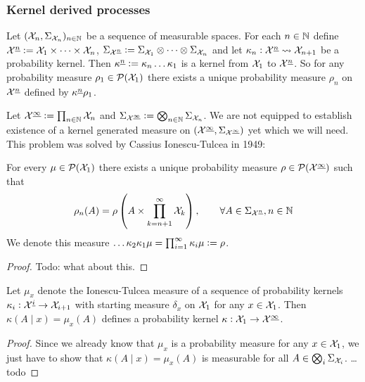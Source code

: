 \subsubsection{Kernel derived processes}

Let $(\mathcal{X}_n, \Sigma_{\mathcal{X}_n})_{n \in \mathbb{N}}$ be a sequence
of measurable spaces. For each $n \in \mathbb{N}$ define
$\mathcal{X}^{\underline{n}} \vcentcolon= \mathcal{X}_1 \times \dots \times \mathcal{X}_n$,
$\Sigma_{\mathcal{X}^{\underline{n}}} \vcentcolon= \Sigma_{\mathcal{X}_1} \otimes
\dots \otimes \Sigma_{\mathcal{X}_n}$
and let
$\kappa_n : \mathcal{X}^{\underline{n}} \leadsto \mathcal{X}_{n+1}$ be a probability kernel.
Then $\kappa^{\underline{n}} \vcentcolon= \kappa_n \dots \kappa_1$ is a kernel
from $\mathcal{X}_1$ to $\mathcal{X}^{\underline{n}}$.
So for any probability measure $\rho_1 \in \mathcal{P}(\mathcal{X}_1)$
there exists a unique probability measure 
$\rho_n$ on $\mathcal{X}^{\underline{n}}$ defined by
$\kappa^{\underline{n}} \rho_1$.

Let $\mathcal{X}^{\underline{\infty}} \vcentcolon= \prod_{n \in \mathbb{N}} \mathcal{X}_n$
and $\Sigma_{\mathcal{X}^{\underline{\infty}}} \vcentcolon= \bigotimes_{n \in \mathbb{N}}
\Sigma_{\mathcal{X}_n}$.
We are not equipped to establish existence of a
kernel generated measure on
$(\mathcal{X}^{\underline{\infty}}, \Sigma_{\mathcal{X}^{\underline{\infty}}})$ 
yet which we will need.
This problem was solved by Cassius Ionescu-Tulcea in 1949:

\begin{thm}
  For every $\mu \in \mathcal{P}(\mathcal{X}_1)$ 
  there exists a unique probability measure
  $\rho \in \mathcal{P}(\mathcal{X}^{\underline{\infty}})$ such that
  \[ \rho_n(A) = \rho \left( A \times \prod_{k=n+1}^\infty \mathcal{X}_k \right)
  , \qquad \forall A \in \Sigma_{\mathcal{X}^{\underline{n}}}, n \in \mathbb{N} \]
  We denote this measure
  $\dots \kappa_2 \kappa_1 \mu = \prod_{i=1}^\infty \kappa_i \mu \vcentcolon= \rho$.
  \label{thm:ionescuTulcea}
\end{thm}
\begin{proof}
  Todo: what about this.
\end{proof}

\begin{prop}
  Let $\mu_x$ denote the Ionescu-Tulcea measure of a
  sequence of probability kernels
  $\kappa_i : \mathcal{X}^{\underline{i}} \to \mathcal{X}_{i+1}$
  with starting measure $\delta_x$ on $\mathcal{X}_1$ for any $x \in \mathcal{X}_1$.
  Then $\kappa(A \mid x) = \mu_x(A)$ defines a probability kernel
  $\kappa : \mathcal{X}_1 \to \mathcal{X}^{\underline{\infty}}$.
\end{prop}
\begin{proof}
  Since we already know that $\mu_x$ is a probability measure for any
  $x \in \mathcal{X}_1$,
  we just have to show that $\kappa(A \mid x) = \mu_x(A)$ is measurable for all
  $A \in \bigotimes_i \Sigma_{\mathcal{X}_i}$.
  \dots todo
\end{proof}

